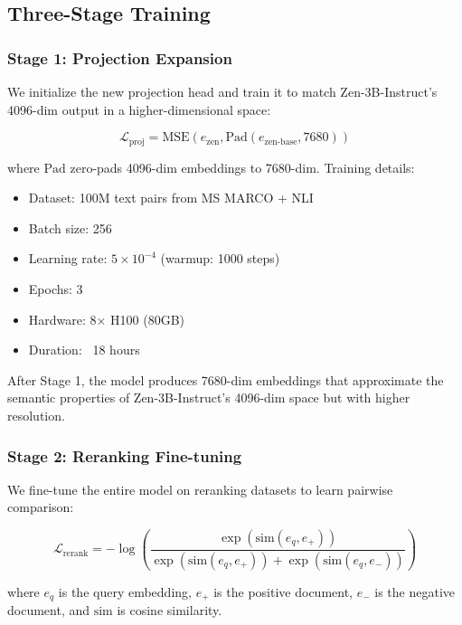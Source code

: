 \documentclass[11pt,letterpaper]{article}
\begin{document}
\subsection{Three-Stage Training}

\subsubsection{Stage 1: Projection Expansion}

We initialize the new projection head and train it to match Zen-3B-Instruct's 4096-dim output in a higher-dimensional space:

\begin{equation}
\mathcal{L}_{\text{proj}} = \text{MSE}(e_{\text{zen}}, \text{Pad}(e_{\text{zen-base}}, 7680))
\end{equation}

where $\text{Pad}$ zero-pads 4096-dim embeddings to 7680-dim. Training details:
\begin{itemize}
    \item Dataset: 100M text pairs from MS MARCO + NLI
    \item Batch size: 256
    \item Learning rate: $5 \times 10^{-4}$ (warmup: 1000 steps)
    \item Epochs: 3
    \item Hardware: 8× H100 (80GB)
    \item Duration: ~18 hours
\end{itemize}

After Stage 1, the model produces 7680-dim embeddings that approximate the semantic properties of Zen-3B-Instruct's 4096-dim space but with higher resolution.

\subsubsection{Stage 2: Reranking Fine-tuning}

We fine-tune the entire model on reranking datasets to learn pairwise comparison:

\begin{equation}
\mathcal{L}_{\text{rerank}} = -\log\left(\frac{\exp(\text{sim}(e_q, e_+))}{\exp(\text{sim}(e_q, e_+)) + \exp(\text{sim}(e_q, e_-))}\right)
\end{equation}

where $e_q$ is the query embedding, $e_+$ is the positive document, $e_-$ is the negative document, and $\text{sim}$ is cosine similarity.
\end{document}
